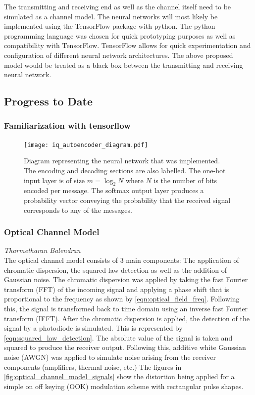         The transmitting and receiving end as well as the channel itself need to be simulated as a channel model. The neural networks will most likely be implemented using the TensorFlow package with python. The python programming language was chosen for quick prototyping purposes as well as compatibility with TensorFlow. TensorFlow allows for quick experimentation and configuration of different neural network architectures. The above proposed model would be treated as a black box between the transmitting and receiving neural network. 
    
\subsection{Progress to Date}

    \subsubsection{Familiarization with tensorflow}
    
    \begin{figure}[H]
		\centering
		\texttt{[image: iq\_autoencoder\_diagram.pdf]}
		\caption{Diagram representing the neural network that was implemented. The encoding and decoding sections are also labelled. The one-hot input layer is of size $m=\log_2 N$ where $N$ is the number of bits encoded per message. The softmax output layer produces a probability vector conveying the probability that the received signal corresponds to any of the messages.}
		\label{fig:iq_autoencoder_diagram}	
	\end{figure}
    
    \subsubsection{Optical Channel Model}
    \hspace*{0pt}\hfill \textit{Tharmetharan Balendran}\\
    
    The optical channel model consists of 3 main components: The application of chromatic dispersion, the squared law detection as well as the addition of Gaussian noise. The chromatic dispersion was applied by taking the fast Fourier transform (FFT) of the incoming signal and applying a phase shift that is proportional to the frequency as shown by \autoref{eqn:optical_field_freq}. Following this, the signal is transformed back to time domain using an inverse fast Fourier transform (IFFT). After the chromatic dispersion is applied, the detection of the signal by a photodiode is simulated. This is represented by \autoref{eqn:squared_law_detection}. The absolute value of the signal is taken and squared to produce the receiver output. Following this, additive white Gaussian noise (AWGN) was applied to simulate noise arising from the receiver components (amplifiers, thermal noise, etc.) The figures in \autoref{fig:optical_channel_model_signals} show the distortion being applied for a simple on off keying (OOK) modulation scheme with rectangular pulse shapes. 
    
